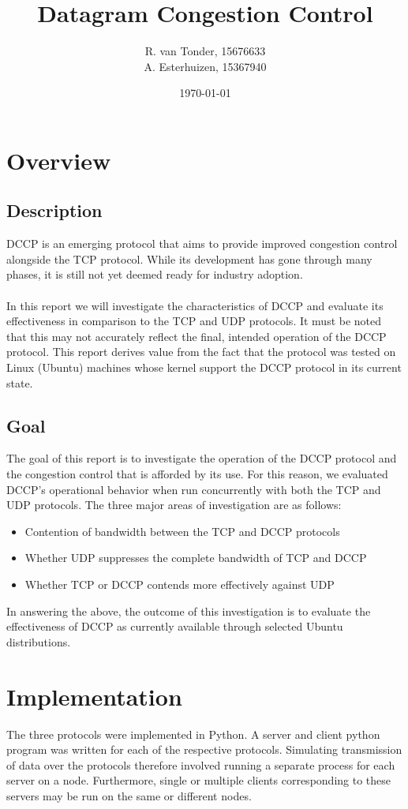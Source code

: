 \documentclass[10pt,a4paper]{article}
\title{Datagram Congestion Control}
\author{R. van Tonder, 15676633 \\ A. Esterhuizen, 15367940}
\date{\today}
\begin{document}
\maketitle
\newpage
\tableofcontents
\newpage

\section{Overview}
\subsection{Description}
DCCP is an emerging protocol that aims to provide improved congestion control
alongside the TCP protocol. While its development has gone through many
phases, it is still not yet deemed ready for industry adoption. 
\paragraph{}
In this report we will investigate the characteristics of DCCP and evaluate its
effectiveness in comparison to the TCP and UDP protocols. It must be noted that
this may not accurately reflect the final, intended operation of the DCCP
protocol. This report derives value from the fact that the protocol was tested
on Linux (Ubuntu) machines whose kernel support the DCCP protocol in
its current state.

\subsection{Goal}
\label{goals}
The goal of this report is to investigate the operation of the DCCP protocol and the congestion control that is afforded
by its use. For this reason, we evaluated DCCP's operational behavior when run concurrently with both the TCP and UDP protocols. 
The three major areas of investigation are as follows:
\begin{itemize}
\item Contention of bandwidth between the TCP and DCCP protocols
\item Whether UDP suppresses the complete bandwidth of TCP and DCCP
\item Whether TCP or DCCP contends more effectively against UDP
\end{itemize}
In answering the above, the outcome of this investigation is to evaluate the effectiveness of DCCP as currently available through 
selected Ubuntu distributions. 


\section{Implementation}
The three protocols were implemented in Python. A server and client python program was written for each
of the respective protocols. Simulating transmission of data over the protocols therefore involved running a
separate process for each server on a node. Furthermore, single or multiple clients corresponding to these
servers may be run on the same or different nodes.
\end{document}
